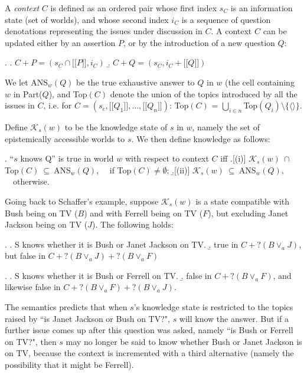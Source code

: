 \documentclass[times,10pt,twocolumn]{article}
\newcommand{\lin}{\ensuremath{\lbrack\!\lbrack}}
\newcommand{\rin}{\ensuremath{\rbrack\!\rbrack}}
\begin{document}

A \emph{context} $C$ is defined as an ordered pair whose first
index $s_C$ is an information state (set of worlds), and whose
second index $i_C$ is a sequence of question denotations
representing  the issues  under discussion in $C$. A context $C$
can be updated either by an assertion $P$, or by the introduction
of a new question $Q$:

\ex. \a. $C+P = (s_C \cap \lin P\rin, i_C)$ \b. $C+Q= (s_C,
i_C+\lin Q\rin)$

We let ANS$_w(Q)$ be the true exhaustive answer to $Q$ in $w$ (the
cell containing $w$ in Part($Q$), and Top$(C)$ denote the union of
the topics introduced by all the issues in $C$, i.e. for $C=
(s_c,\lin Q_1 \rin, ..., \lin Q_n \rin)$: Top$(C)$ =
$\bigcup_{i\in n} $Top$(Q_i) \setminus \{\langle \rangle\}$.

Define $\mathcal{K}_{s}(w)$ to be the knowledge state of $s$ in
$w$, namely the set of epistemically accessible worlds to $s$. We
then define knowledge as follows:

\ex. ``$s$ knows Q'' is true in world $w$ with respect to context
$C$ iff \a.[(i)] $\mathcal{K}_{s}(w) \ \cap\ $Top$(C) \ \subseteq
\ $ANS$_w(Q)$, \ \ if  Top$(C)\neq\emptyset$; \b.[(ii)]
$\mathcal{K}_{s}(w) \ \subseteq \ $ANS$_w(Q)$,  \ \ otherwise.



Going back to Schaffer's example, suppose $\mathcal{K}_{s}(w)$ is
a state compatible with Bush being on TV ($B$) and with Ferrell
being on TV ($F$), but excluding Janet Jackson being on TV ($J$).
The following holds:

\ex.\label{bj} \a. S knows whether it is Bush or Janet Jackson on
TV. \b. true in $C + ?(B \vee_a J)$, but false in $C +  ? (B
\vee_a J) + ? (B \vee_a F)$

\ex.\label{bf} \a. S knows whether it is Bush or Ferrell on TV.
\b. false in $C + ?(B \vee_a F)$, and likewise false in $C + ?(B
\vee_a F) + ?(B\vee_a J)$.

The semantics predicts that when $s$'s knowledge state is
restricted to the topics raised by ``is Janet Jackson or Bush on
TV?", $s$ will know the answer. But if a further issue comes up
after this question was asked, namely ``is Bush or Ferrell on
TV?", then $s$ may no longer be said to know whether Bush or Janet
Jackson is on TV, because the context is incremented with a third
alternative (namely the possibility that it might be Ferrell).
\end{document}
